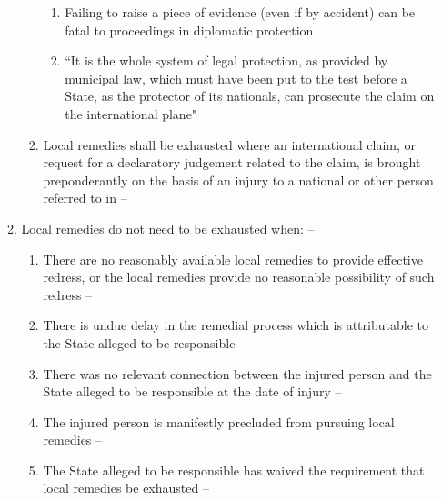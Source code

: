 \begin{enumerate}
\begin{enumerate}
\begin{enumerate}
            \begin{enumerate}
                \item Failing to raise a piece of evidence (even if by accident) can be fatal to proceedings in diplomatic protection
                \item ``It is the whole system of legal protection, as provided by municipal law, which must have been put to the test before a State, as the protector of its nationals, can prosecute the claim on the international plane"
            \end{enumerate}
            \item Local remedies shall be exhausted where an international claim, or request for a declaratory judgement related to the claim, is brought preponderantly on the basis of an injury to a national or other person referred to in  -- 
        \end{enumerate}
        \item Local remedies do not need to be exhausted when: -- 
        \begin{enumerate}
            \item There are no reasonably available local remedies to provide effective redress, or the local remedies provide no reasonable possibility of such redress -- 
            \item There is undue delay in the remedial process which is attributable to the State alleged to be responsible -- 
            \item There was no relevant connection between the injured person and the State alleged to be responsible at the date of injury -- 
            \item The injured person is manifestly precluded from pursuing local remedies -- 
            \item The State alleged to be responsible has waived the requirement that local remedies be exhausted -- 
        \end{enumerate}
    \end{enumerate}
\end{enumerate}

